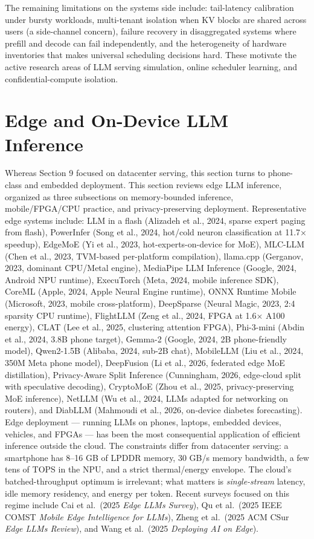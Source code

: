\documentclass{article}
\begin{document}
The remaining limitations on the systems side include: tail-latency calibration under bursty workloads, multi-tenant isolation when KV blocks are shared across users (a side-channel concern), failure recovery in disaggregated systems where prefill and decode can fail independently, and the heterogeneity of hardware inventories that makes universal scheduling decisions hard. These motivate the active research areas of LLM serving simulation, online scheduler learning, and confidential-compute isolation.

\section{Edge and On-Device LLM Inference}\label{edge-and-on-device-llm-inference}

Whereas Section 9 focused on datacenter serving, this section turns to phone-class and embedded deployment. This section reviews edge LLM inference, organized as three subsections on memory-bounded inference, mobile/FPGA/CPU practice, and privacy-preserving deployment. Representative edge systems include: LLM in a flash (Alizadeh et al., 2024, sparse expert paging from flash), PowerInfer (Song et al., 2024, hot/cold neuron classification at 11.7× speedup), EdgeMoE (Yi et al., 2023, hot-experts-on-device for MoE), MLC-LLM (Chen et al., 2023, TVM-based per-platform compilation), llama.cpp (Gerganov, 2023, dominant CPU/Metal engine), MediaPipe LLM Inference (Google, 2024, Android NPU runtime), ExecuTorch (Meta, 2024, mobile inference SDK), CoreML (Apple, 2024, Apple Neural Engine runtime), ONNX Runtime Mobile (Microsoft, 2023, mobile cross-platform), DeepSparse (Neural Magic, 2023, 2:4 sparsity CPU runtime), FlightLLM (Zeng et al., 2024, FPGA at 1.6× A100 energy), CLAT (Lee et al., 2025, clustering attention FPGA), Phi-3-mini (Abdin et al., 2024, 3.8B phone target), Gemma-2 (Google, 2024, 2B phone-friendly model), Qwen2-1.5B (Alibaba, 2024, sub-2B chat), MobileLLM (Liu et al., 2024, 350M Meta phone model), DeepFusion (Li et al., 2026, federated edge MoE distillation), Privacy-Aware Split Inference (Cunningham, 2026, edge-cloud split with speculative decoding), CryptoMoE (Zhou et al., 2025, privacy-preserving MoE inference), NetLLM (Wu et al., 2024, LLMs adapted for networking on routers), and DiabLLM (Mahmoudi et al., 2026, on-device diabetes forecasting). Edge deployment --- running LLMs on phones, laptops, embedded devices, vehicles, and FPGAs --- has been the most consequential application of efficient inference outside the cloud. The constraints differ from datacenter serving: a smartphone has 8--16 GB of LPDDR memory, 30 GB/s memory bandwidth, a few tens of TOPS in the NPU, and a strict thermal/energy envelope. The cloud's batched-throughput optimum is irrelevant; what matters is \emph{single-stream} latency, idle memory residency, and energy per token. Recent surveys focused on this regime include Cai et al.~(2025 \emph{Edge LLMs Survey}), Qu et al.~(2025 IEEE COMST \emph{Mobile Edge Intelligence for LLMs}), Zheng et al.~(2025 ACM CSur \emph{Edge LLMs Review}), and Wang et al.~(2025 \emph{Deploying AI on Edge}).
\end{document}
